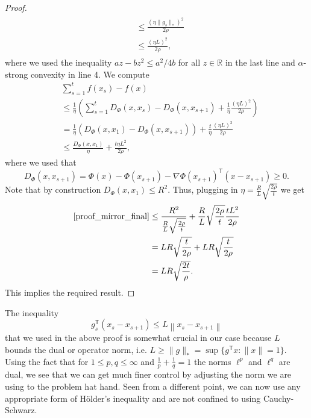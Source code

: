 \begin{proof}
\begin{align}
\begin{aligned}
	& \leq \frac{\left(\eta \|g_s\|_\ast\right)^2}{2\rho} \\
    & \leq \frac{\left(\eta L\right)^2}{2\rho},
    \end{aligned}
\end{align}
where we used the inequality $az - bz^2 \leq a^2/4b$ for all $z\in \mathbb{R}$ in the last line and $\alpha$-strong convexity in line 4. We compute
\begin{align}
	& \sum_{s=1}^t f(x_s) - f(x) \nonumber \\
	& \leq  \frac{1}{\eta} \left(\sum_{s=1}^t D_\Phi(x, x_s) - D_\Phi(x, x_{s+1}) +  \frac{1}{\eta}\frac{\left(\eta L\right)^2}{2\rho}\right) \nonumber \\
	& =  \frac{1}{\eta} \left(D_\Phi(x, x_1) - D_\Phi(x, x_{s+1})\right) +  \frac{t}{\eta}\frac{\left(\eta L\right)^2}{2\rho} \nonumber \\ \label{proof_mirror_final}
	& \leq \frac{D_\Phi(x, x_1)}{\eta} + \frac{t\eta L^2}{2\rho},
\end{align}
where we used that 
\begin{equation*}
	D_\Phi(x, x_{s+1}) = \Phi(x) - \Phi(x_{s+1}) - \nabla \Phi(x_{s+1})^\mathsf{T}(x - x_{s+1}) \geq 0.
\end{equation*}
Note that by construction $D_\Phi(x,x_1) \leq R^2$. Thus, plugging in $\eta =\frac{R}{L}\sqrt{\frac{2\rho}{t}}$ we get
\begin{align*}
	\eqref{proof_mirror_final} &\leq \frac{R^2}{\frac{R}{L}\sqrt{\frac{2\rho}{t}}} + \frac{R}{L}\sqrt{\frac{2\rho}{t}}\frac{t L^2}{2\rho} \\
	& = LR \sqrt{\frac{t}{2 \rho}} + LR\sqrt{\frac{t}{2 \rho}} \\
	& = LR \sqrt{\frac{2t}{\rho}}.
\end{align*}
This implies the required result.
\end{proof}
\begin{remark}
The inequality
\begin{equation*}
g_s^\mathsf{T}\left(x_s - x_{s+1}\right) \leq L\left\|x_s - x_{s+1}\right\|
\end{equation*}
that we used in the above proof is somewhat crucial in our case because $L$ bounds the dual or operator norm, i.e. $L \geq \|g\|_* = \sup\{g^\mathsf{T}x : \|x\|=1\}$. Using the fact that for $1 \leq p, q \leq \infty$ and $\frac{1}{p} + \frac{1}{q} = 1$ the norms $\ell^p$ and $\ell^q$ are dual, we see that we can get much finer control by adjusting the norm we are using to the problem hat hand. Seen from a different point, we can now use any appropriate form of Hölder's inequality and are not confined to using Cauchy-Schwarz.
\end{remark}

